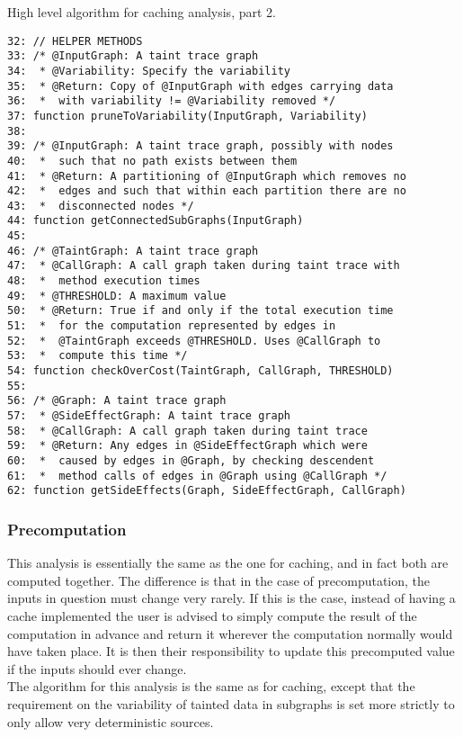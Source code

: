 \documentclass[msc,oneside]{ubcthesis}
\begin{document}
\begin{Program}
  \caption{\label{prog:code2part2} High level algorithm for caching analysis, part 2.}
\begin{verbatim}
32: // HELPER METHODS
33: /* @InputGraph: A taint trace graph
34:  * @Variability: Specify the variability 
35:  * @Return: Copy of @InputGraph with edges carrying data
36:  *  with variability != @Variability removed */
37: function pruneToVariability(InputGraph, Variability)
38:   
39: /* @InputGraph: A taint trace graph, possibly with nodes
40:  *  such that no path exists between them
41:  * @Return: A partitioning of @InputGraph which removes no 
42:  *  edges and such that within each partition there are no
43:  *  disconnected nodes */
44: function getConnectedSubGraphs(InputGraph)
45: 
46: /* @TaintGraph: A taint trace graph
47:  * @CallGraph: A call graph taken during taint trace with 
48:  *  method execution times
49:  * @THRESHOLD: A maximum value
50:  * @Return: True if and only if the total execution time 
51:  *  for the computation represented by edges in 
52:  *  @TaintGraph exceeds @THRESHOLD. Uses @CallGraph to
53:  *  compute this time */
54: function checkOverCost(TaintGraph, CallGraph, THRESHOLD)
55: 
56: /* @Graph: A taint trace graph
57:  * @SideEffectGraph: A taint trace graph
58:  * @CallGraph: A call graph taken during taint trace
59:  * @Return: Any edges in @SideEffectGraph which were 
60:  *  caused by edges in @Graph, by checking descendent
61:  *  method calls of edges in @Graph using @CallGraph */
62: function getSideEffects(Graph, SideEffectGraph, CallGraph)
\end{verbatim}
\end{Program}

\subsubsection{Precomputation}
This analysis is essentially the same as the one for caching, and in fact both are computed together. The difference is that in the case of precomputation, the inputs in question must change very rarely. If this is the case, instead of having a cache implemented the user is advised to simply compute the result of the computation in advance and return it wherever the computation normally would have taken place. It is then their responsibility to update this precomputed value if the inputs should ever change.\\

The algorithm for this analysis is the same as for caching, except that the requirement on the variability of tainted data in subgraphs is set more strictly to only allow very deterministic sources.\\
\end{document}
